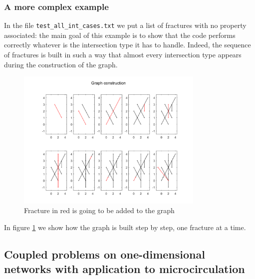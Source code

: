 \documentclass[10pt]{article} %
\begin{document}
	\subsubsection{A more complex example}
	In the file \texttt{test\_all\_int\_cases.txt} we put a list of fractures with no property associated: the main goal of this example is to show that the code performs correctly whatever is the intersection type it has to handle. Indeed, the sequence of fractures is built in such a way that almost every intersection type appears during the construction of the graph. 
	\begin{figure}
		\centering 
		\includegraphics[width=0.8\textwidth]{graph_building_process}
		\caption{Fracture in red is going to be added to the graph}
		\label{fig:graph_steps}
	\end{figure}
	In figure \ref{fig:graph_steps} we show how the graph is built step by step, one fracture at a time.
	
	\subsection{Coupled problems on one-dimensional networks with application to microcirculation}
	
\end{document}
